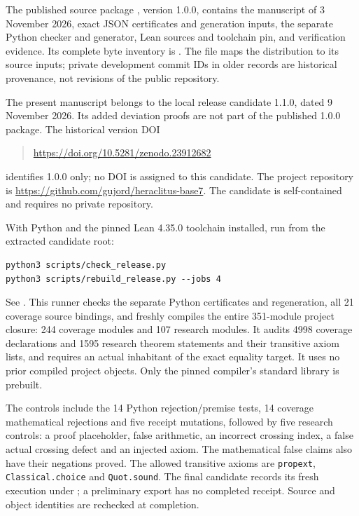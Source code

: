 \documentclass[11pt,a4paper]{article}
\begin{document}
The published source package \cite{package}, version 1.0.0, contains the
manuscript of 3 November 2026,
exact JSON certificates and generation inputs, the separate Python checker
and generator, Lean sources and toolchain pin, and verification evidence.
Its complete byte inventory is . The file
 maps the distribution to its source inputs;
private development commit IDs in older records are historical provenance,
not revisions of the public repository.

The present manuscript belongs to the local release candidate 1.1.0,
dated 9 November 2026. Its added deviation proofs are not part of the
published 1.0.0 package. The historical version DOI
\begin{quote}\small
\mbox{\url{https://doi.org/10.5281/zenodo.23912682}}
\end{quote}
identifies 1.0.0 only; no DOI is assigned to this candidate. The project
repository is \url{https://github.com/gujord/heraclitus-base7}.
The candidate is self-contained and requires no private repository.

With Python and the pinned Lean 4.35.0 toolchain installed, run from the
extracted candidate root:
\begin{verbatim}
python3 scripts/check_release.py
python3 scripts/rebuild_release.py --jobs 4
\end{verbatim}
See . This runner checks the separate Python
certificates and regeneration, all 21 coverage source bindings, and freshly
compiles the entire 351-module project closure: 244 coverage modules and
107 research modules. It audits 4998 coverage declarations and 1595 research
theorem statements and their transitive axiom lists, and requires an actual
inhabitant of the exact equality target. It uses no prior compiled project
objects. Only the pinned compiler's standard library is prebuilt.

The controls include the 14 Python rejection/premise tests, 14 coverage
mathematical rejections and five receipt mutations, followed by five research
controls: a proof placeholder, false arithmetic, an incorrect crossing index,
a false actual crossing defect and an injected axiom. The mathematical false
claims also have their negations proved. The allowed transitive axioms are
\texttt{propext}, \texttt{Classical.choice} and \texttt{Quot.sound}.
The final candidate records its fresh execution under
; a preliminary export has no completed receipt.
Source and object identities are rechecked at completion.
\end{document}
